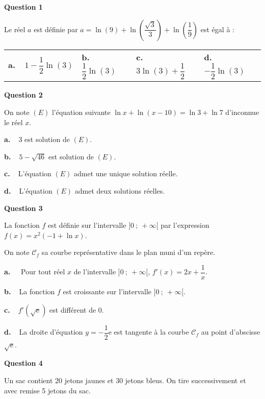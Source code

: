 \documentclass[10pt]{article}
\begin{document}
\medskip

\textbf{Question 1}

\medskip

Le réel $a$ est définie par $a = \ln (9) + \ln \left(\dfrac{\sqrt{3}}{3} \right)  + \ln \left(\dfrac19 \right)$ est égal à :

\begin{center}
\begin{tabularx}{\linewidth}{*{4}{X}}
\textbf{a.~~}$1 - \dfrac12 \ln (3)$&\textbf{b.~~} $\dfrac12 \ln (3)$&\textbf{c.~~} $3 \ln (3) + \dfrac12$ &\textbf{d.~~} $- \dfrac12 \ln (3)$
\end{tabularx}
\end{center}
 
\medskip

\textbf{Question 2}

\medskip

On note $(E)$ l'équation suivante $\ln x + \ln (x - 10) = \ln 3 + \ln 7$ d'inconnue le réel $x$.

\medskip
\textbf{a.~~}3 est solution de $(E)$.

\textbf{b.~~}$5 - \sqrt{46}$ est solution de $(E)$.

\textbf{c.~~}L'équation $(E)$ admet une unique solution réelle.

\textbf{d.~~}L'équation $(E)$ admet deux solutions réelles.

\medskip

\textbf{Question 3}

\medskip

La fonction $f$ est définie sur l'intervalle $]0~;~+ \infty[$ par l'expression $f(x) = x^2(- 1 + \ln x)$.

On note $\mathcal{C}_f$ sa courbe représentative dans le plan muni d'un repère.

\textbf{a.~~} Pour tout réel $x$ de l'intervalle $]0~;~+ \infty[$, \: $f'(x) = 2x + \dfrac1x$.

\textbf{b.~~}La fonction $f$ est croissante sur l'intervalle $]0~;~+ \infty[$.

\textbf{c.~~}$f'\left(\sqrt{\text{e}} \right)$ est différent de $0$.

\textbf{d.~~}La droite d'équation $y = - \dfrac12 \text{e}$ est tangente à la courbe $\mathcal{C}_f$ au point d'abscisse $\sqrt{\text{e}}$.

\medskip

\textbf{Question 4}

\medskip

Un sac contient 20 jetons jaunes et 30 jetons bleus. On tire successivement et avec remise 5 jetons du sac.
\end{document}
